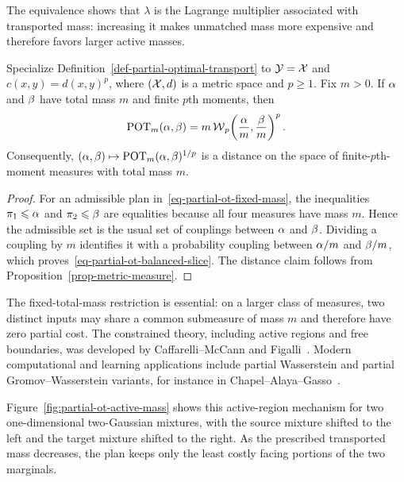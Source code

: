 The equivalence shows that $\lambda$ is the Lagrange multiplier associated with transported mass: increasing it makes unmatched mass more expensive and therefore favors larger active masses.

\begin{prop}\label{prop-partial-ot-metric-slice}
Specialize Definition~\ref{def-partial-optimal-transport} to $\mathcal{Y}=\mathcal{X}$ and $c(x,y)=d(x,y)^p$, where $(\mathcal{X},d)$ is a metric space and $p\geq1$. Fix $m>0$. If $\alpha$ and $\beta$ have total mass $m$ and finite $p$th moments, then
\begin{equation}\label{eq-partial-ot-balanced-slice}
\operatorname{POT}_m(\alpha,\beta)
=
m\operatorname{\mathcal{W}}_p\!\left(\frac{\alpha}{m},\frac{\beta}{m}\right)^p.
\end{equation}
Consequently, $(\alpha,\beta)\mapsto\operatorname{POT}_m(\alpha,\beta)^{1/p}$ is a distance on the space of finite-$p$th-moment measures with total mass $m$.
\end{prop}

\begin{proof}
For an admissible plan in~\eqref{eq-partial-ot-fixed-mass}, the inequalities $\pi_1\leqslant\alpha$ and $\pi_2\leqslant\beta$ are equalities because all four measures have mass $m$. Hence the admissible set is the usual set of couplings between $\alpha$ and $\beta$. Dividing a coupling by $m$ identifies it with a probability coupling between $\alpha/m$ and $\beta/m$, which proves~\eqref{eq-partial-ot-balanced-slice}. The distance claim follows from Proposition~\ref{prop-metric-measure}.
\end{proof}

The fixed-total-mass restriction is essential: on a larger class of measures, two distinct inputs may share a common submeasure of mass $m$ and therefore have zero partial cost. The constrained theory, including active regions and free boundaries, was developed by Caffarelli--McCann and Figalli~\cite{CaffarelliMcCannPartial,FigalliPartial}. Modern computational and learning applications include partial Wasserstein and partial Gromov--Wasserstein variants, for instance in Chapel--Alaya--Gasso~\cite{ChapelAlayaGassoPartial}.

Figure~\ref{fig:partial-ot-active-mass} shows this active-region mechanism for two one-dimensional two-Gaussian mixtures, with the source mixture shifted to the left and the target mixture shifted to the right. As the prescribed transported mass decreases, the plan keeps only the least costly facing portions of the two marginals.

